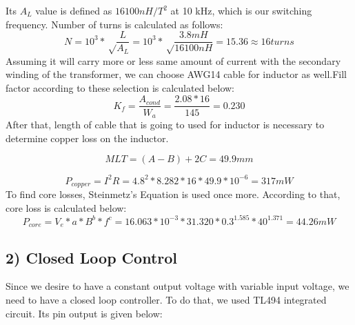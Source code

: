 \documentclass{article}
\newcommand\tab[1][1cm]{\hspace*{#1}}
\begin{document}
Its $A_L$ value is defined as $16100 nH/T^2$ at 10 kHz, which is our switching frequency. Number of turns is calculated as follows:
\begin{equation*}
    N=10^3*\sqrt\frac{L}{A_L}=10^3*\sqrt\frac{3.8 mH}{16100 nH}=15.36 \approx 16 turns
\end{equation*}
Assuming it will carry more or less same amount of current with the secondary winding of the transformer, we can choose AWG14 cable for inductor as well.Fill factor according to these selection is calculated below:
\begin{equation*}
    K_f=\frac{A_{cond}}{W_a}=\frac{2.08*16}{145}=0.230
\end{equation*}
After that, length of cable that is going to used for inductor is necessary to determine copper loss on the inductor. 

\begin{equation*}
    MLT=(A-B)+2C=49.9 mm
\end{equation*}

\begin{equation*}
    P_{copper}=I^2R=4.8^2*8.282*16*49.9*10^{-6}=317 mW
\end{equation*}
\tab To find core losses, Steinmetz's Equation is used once more.  According to that, core loss is calculated below:
\begin{equation*}
    P_{core}=V_e*a*B^b*f^c=16.063*10^{-3}*31.320*0.3^{1.585}*40^{1.371}=44.26 mW
\end{equation*}
\subsection*{2) Closed Loop Control}
\tab Since we desire to have a constant output voltage with variable input voltage, we need to have a closed loop controller. To do that, we used TL494 integrated circuit. Its pin output is given below:
\end{document}

